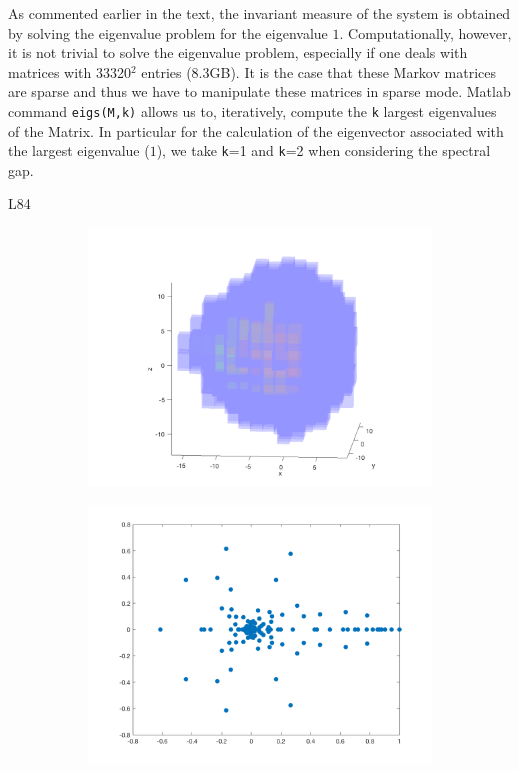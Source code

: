 As commented earlier in the text, the invariant measure of the system is obtained by solving the eigenvalue problem for the eigenvalue $1$. Computationally, however, it is not trivial to solve the eigenvalue problem, especially if one deals with matrices with 33320$^2$ entries (8.3GB). It is the case that these Markov matrices are sparse and thus we have to manipulate these matrices in sparse mode. Matlab command \texttt{eigs(M,k)} allows us to, iteratively, compute the \texttt{k} largest eigenvalues of the Matrix. In particular for the calculation of the eigenvector associated with the largest eigenvalue ($1$), we take \texttt{k}=1 and \texttt{k}=2 when considering the spectral gap.

L84

\begin{figure}[H]
	\centering
	\begin{subfigure}[b]{0.4\textwidth}
		\includegraphics[width=\textwidth]{l84.png}
	\end{subfigure}
	\begin{subfigure}[b]{0.4\textwidth}
		\includegraphics[width=\textwidth]{spectralgapl84.png}

\end{subfigure}
\end{figure}
